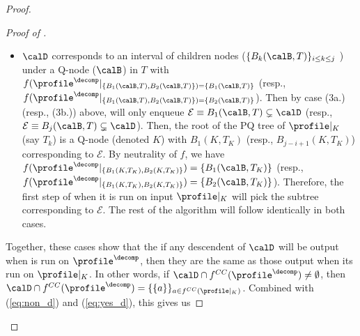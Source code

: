 \begin{proof}
\begin{proof}[Proof of ]
\begin{itemize}
            \item $\calD$ corresponds to an interval of children nodes ($\{B_k(\calB,T)\}_{i \leq k \leq j}$ ) under a Q-node ($\calB$) in $T$ with $f(\profile^{\decomp}|_{{\{B_1(\calB,T),B_2(\calB,T)\}})=\{B_1(\calB,T)\}}$ (resp., $f(\profile^{\decomp}|_{{\{B_1(\calB,T),B_2(\calB,T)\}})=\{B_2(\calB,T)\}}$). Then by case (3a.) (resp., (3b.)) above,  will only enqueue $\mathcal{E}\equiv B_1(\calB,T)\subsetneq \calD$ (resp., $\mathcal{E}\equiv B_j(\calB,T)\subsetneq \calD$). Then, the root of the PQ tree of $\profile|_K$ (say $T_k$) is a Q-node (denoted $K$) with $B_1(K,T_K)$ (resp., $B_{j-i+1}(K,T_K)$) corresponding to $\mathcal{E}$. By neutrality of $f$, we have $f(\profile^{\decomp}|_{\{B_1(K,T_K),B_2(K,T_K)\}})=\{B_1(\calB,T_K)\}$ (resp., $f(\profile^{\decomp}|_{\{B_1(K,T_K),B_2(K,T_K)\}})=\{B_2(\calB,T_K)\}$). Therefore, the first step of  when it is run on input $\profile|_K$ will pick the subtree corresponding to $\mathcal{E}$. The rest of the algorithm will follow identically in both cases.
    \end{itemize}
    Together, these cases show that the if any descendent of $\calD$ will be output when  is run on $\profile^\decomp$, then they are the same as those output when its run on $\profile|_K$. In other words, if $ \calD \cap f^{CC}(\profile^\decomp) \neq \emptyset$, then $\calD \cap f^{CC}(\profile^\decomp)=\{\{a\}\}_{a \in f^{CC}(\profile|_{K})}$. Combined with (\ref{eq:non_d}) and (\ref{eq:yes_d}), this gives us
    

\end{proof}
\end{proof}
